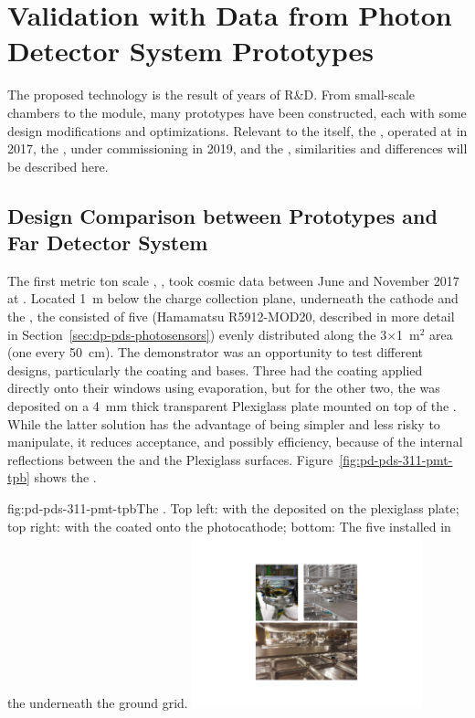 \section{Validation with Data from Photon Detector System Prototypes}
\label{sec:dp-pds-prototypes}

The    proposed technology is the result of years of R\&D. From small-scale chambers to the  module, many prototypes have been constructed, each with some design modifications and optimizations. 
Relevant to the  itself, the , operated at  in 2017, the , under commissioning in 2019, and the  , similarities and differences will be described here.

\subsection{Design Comparison between Prototypes and Far Detector System}
The first metric ton scale  , , took cosmic data between June and November \num{2017} at . 
Located \SI{1}{m} below the charge collection plane, underneath the cathode and the , the  consisted of five  (Hamamatsu R5912-MOD20, described in more detail in Section~\ref{sec:dp-pds-photosensors}) evenly distributed along the 3$\times$1~m$^2$ area (one  every \SI{50}{cm}). The demonstrator was an opportunity to test different  designs, particularly the  coating and  bases. Three  had the  coating applied directly onto their windows using evaporation, but for the other two, the  was deposited on a \SI{4}{\mm} thick transparent Plexiglass plate mounted on top of the . 
While the latter solution has the advantage of being simpler and less risky to manipulate, it reduces acceptance, and possibly efficiency, because of the internal reflections between the  and the Plexiglass surfaces. 
Figure~\ref{fig:pd-pds-311-pmt-tpb} shows the  .

\begin{dunefigure}{fig:pd-pds-311-pmt-tpb}{The  . Top left:  with the  deposited on the plexiglass plate; top right:  with the  coated onto the photocathode; bottom: The five  installed in the  underneath the ground grid.}
\includegraphics[width=0.5\textwidth]{graphics/dppd_311_PMT_combined}
\end{dunefigure}

